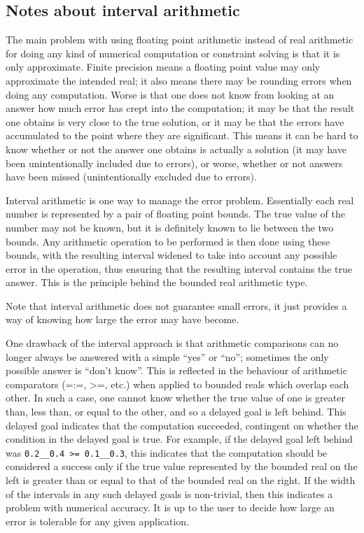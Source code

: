 \subsection{Notes about interval arithmetic}

The main problem with using floating point arithmetic instead of real
arithmetic for doing any kind of numerical computation or constraint solving
is that it is only approximate.  Finite precision means a floating point
value may only approximate the intended real; it also means there may be
rounding errors when doing any computation.  Worse is that one does not know
from looking at an answer how much error has crept into the computation; it
may be that the result one obtains is very close to the true solution, or it
may be that the errors have accumulated to the point where they are
significant.  This means it can be hard to know whether or not the answer
one obtains is actually a solution (it may have been unintentionally
included due to errors), or worse, whether or not answers have been missed
(unintentionally excluded due to errors).

Interval arithmetic is one way to manage the error problem.  Essentially
each real number is represented by a pair of floating point bounds.  The
true value of the number may not be known, but it is definitely known to lie
between the two bounds.  Any arithmetic operation to be performed is then
done using these bounds, with the resulting interval widened to take into
account any possible error in the operation, thus ensuring that the resulting
interval contains the true answer.  This is the principle behind the bounded
real arithmetic type.

Note that interval arithmetic does not guarantee small errors, it just
provides a way of knowing how large the error may have become.

One drawback of the interval approach is that arithmetic comparisons can no
longer always be answered with a simple ``yes'' or ``no''; sometimes the
only possible answer is ``don't know''.  This is reflected in the behaviour
of arithmetic comparators (=:=, >=, etc.) when applied to bounded reals
which overlap each other.  In such a case, one cannot know whether the true
value of one is greater than, less than, or equal to the other, and so a
delayed goal is left behind.  This delayed goal indicates that the
computation succeeded, contingent on whether the condition in the delayed
goal is true.  For example, if the delayed goal left behind was
\verb+0.2__0.4 >= 0.1__0.3+, this indicates that the computation should be
considered a success only if the true value represented by the bounded real
on the left is greater than or equal to that of the bounded real on the
right.  If the width of the intervals in any such delayed goals is
non-trivial, then this indicates a problem with numerical accuracy.  It is
up to the user to decide how large an error is tolerable for any given
application.


